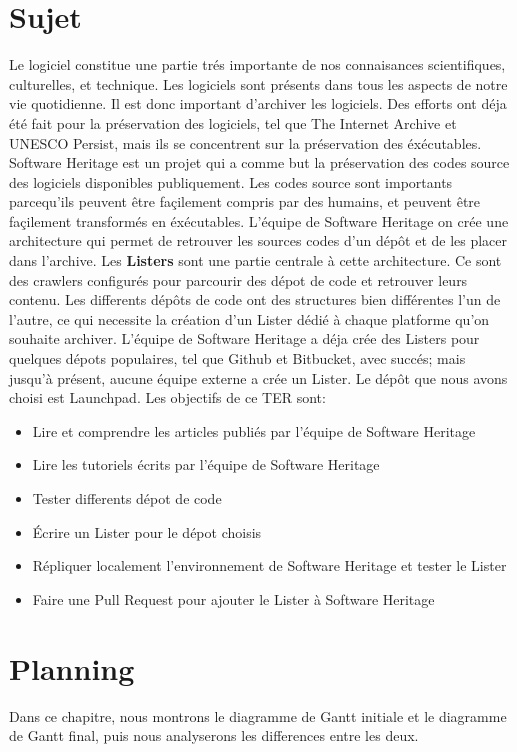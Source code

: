 \documentclass[12pt,a4paper]{report}
\begin{document}
\chapter{Sujet}
Le logiciel constitue une partie trés importante de nos connaisances scientifiques, culturelles, et technique. Les logiciels sont présents dans tous les aspects de notre vie quotidienne. Il est donc important d'archiver les logiciels.\newline
Des efforts ont déja été fait pour la préservation des logiciels, tel que The Internet Archive et UNESCO Persist, mais ils se concentrent sur la préservation des éxécutables.
Software Heritage est un projet qui a comme but la préservation des codes source des logiciels disponibles publiquement. Les codes source sont importants parcequ'ils peuvent être façilement compris par des humains, et peuvent être façilement transformés en éxécutables.\newline
L'équipe de Software Heritage on crée une architecture qui permet de retrouver les sources codes d'un dépôt et de les placer dans l'archive. Les \textbf{Listers} sont une partie centrale à cette architecture. Ce sont des crawlers configurés pour parcourir des dépot de code et retrouver leurs contenu. Les differents dépôts de code ont des structures bien différentes l'un de l'autre, ce qui necessite la création d'un Lister dédié à chaque platforme qu'on souhaite archiver. L'équipe de Software Heritage a déja crée des Listers pour quelques dépots populaires, tel que Github et Bitbucket, avec succés; mais jusqu'à présent, aucune équipe externe a crée un Lister. Le dépôt que nous avons choisi est Launchpad.
\newline
Les objectifs de ce TER sont:
\begin{itemize}
  \item Lire et comprendre les articles publiés par l'équipe de Software Heritage
  \item Lire les tutoriels écrits par l'équipe de Software Heritage
  \item Tester differents dépot de code
  \item Écrire un Lister pour le dépot choisis
  \item Répliquer localement l'environnement de Software Heritage et tester le Lister
  \item Faire une Pull Request pour ajouter le Lister à Software Heritage
\end{itemize}
\chapter{Planning}
Dans ce chapitre, nous montrons le diagramme de Gantt initiale et le diagramme de Gantt final, puis nous analyserons les differences entre les deux. 
\end{document}
